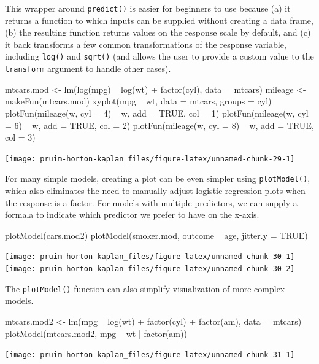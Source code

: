 This wrapper around \texttt{predict()} is easier for beginners to use
because (a) it returns a function to which inputs can be supplied
without creating a data frame, (b) the resulting function returns values
on the response scale by default, and (c) it back transforms a few
common transformations of the response variable, including
\texttt{log()} and \texttt{sqrt()} (and allows the user to provide a
custom value to the \texttt{transform} argument to handle other cases).

\begin{Schunk}
\begin{Sinput}
mtcars.mod <- lm(log(mpg) ~ log(wt) + factor(cyl), data = mtcars)
mileage <- makeFun(mtcars.mod)
xyplot(mpg ~ wt, data = mtcars, groups = cyl)
plotFun(mileage(w, cyl = 4) ~ w, add = TRUE, col = 1)
plotFun(mileage(w, cyl = 6) ~ w, add = TRUE, col = 2)
plotFun(mileage(w, cyl = 8) ~ w, add = TRUE, col = 3)
\end{Sinput}


\begin{center}\texttt{[image: pruim-horton-kaplan\_files/figure-latex/unnamed-chunk-29-1]} \end{center}

\end{Schunk}

For many simple models, creating a plot can be even simpler using
\texttt{plotModel()}, which also eliminates the need to manually adjust
logistic regression plots when the response is a factor. For models with
multiple predictors, we can supply a formala to indicate which predictor
we prefer to have on the x-axis.

\begin{Schunk}
\begin{Sinput}
plotModel(cars.mod2)
plotModel(smoker.mod, outcome ~ age, jitter.y = TRUE)
\end{Sinput}


\begin{center}\texttt{[image: pruim-horton-kaplan\_files/figure-latex/unnamed-chunk-30-1]} \texttt{[image: pruim-horton-kaplan\_files/figure-latex/unnamed-chunk-30-2]} \end{center}

\end{Schunk}

\noindent
The \texttt{plotModel()} function can also simplify visualization of
more complex models.

\begin{Schunk}
\begin{Sinput}
mtcars.mod2 <- lm(mpg ~ log(wt) + factor(cyl) + factor(am), data = mtcars)
plotModel(mtcars.mod2, mpg ~ wt | factor(am))
\end{Sinput}


\begin{center}\texttt{[image: pruim-horton-kaplan\_files/figure-latex/unnamed-chunk-31-1]} \end{center}

\end{Schunk}

